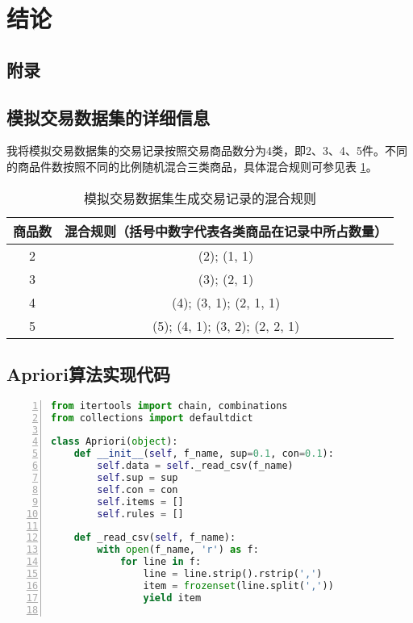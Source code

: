 \documentclass[12pt,a4paper]{article}
\theoremstyle{definition}
\begin{document}
\section{结论}


\newpage
\begin{appendix}
	\section{附录}
	\subsection{模拟交易数据集的详细信息}
	\label{apd:dataset}
	
	我将模拟交易数据集的交易记录按照交易商品数分为4类，即2、3、4、5件。不同的商品件数按照不同的比例随机混合三类商品，具体混合规则可参见表 \ref{tab:dataset}。
	
	\begin{table}[H]
		\renewcommand\arraystretch{1.35}
		\caption{模拟交易数据集生成交易记录的混合规则}
		\label{tab:dataset}
		\centering
		
		\begin{tabular}{c|c}
			\centering
			商品数 & 混合规则（括号中数字代表各类商品在记录中所占数量） \\
			\hline
			2 & (2); (1, 1) \\
			3 & (3); (2, 1) \\
			4 & (4); (3, 1); (2, 1, 1) \\
			5 & (5); (4, 1); (3, 2); (2, 2, 1) \\		
		\end{tabular}
	\end{table}
	
	
	\subsection{Apriori算法实现代码}
	\label{apd:code}
	
	\begin{lstlisting}[language=Python,
	numbers=left,
	keywordstyle=\color{blue!70},
	frame=shadowbox,
	breaklines=True]
from itertools import chain, combinations
from collections import defaultdict

class Apriori(object):
    def __init__(self, f_name, sup=0.1, con=0.1):
        self.data = self._read_csv(f_name)
        self.sup = sup
        self.con = con
        self.items = []
        self.rules = []

    def _read_csv(self, f_name):
        with open(f_name, 'r') as f:
            for line in f:
                line = line.strip().rstrip(',')
                item = frozenset(line.split(','))
                yield item


\end{lstlisting}
\end{appendix}
\end{document}
